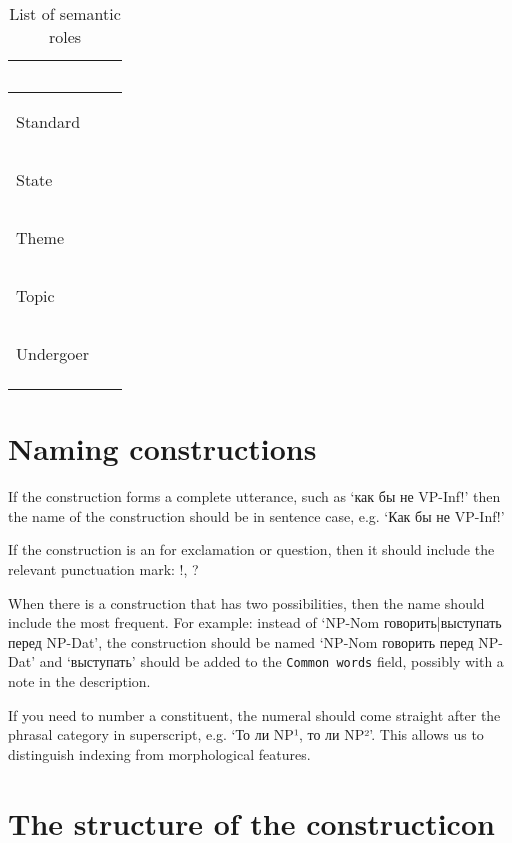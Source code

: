 \documentclass[a4paper,11pt, onecolumn,twoside]{article}
\begin{document}
\begin{longtable}{ p{}  p{} }
        & ~ \\
\midrule
 \multirow{2}{*}{Standard} & ~ \\ %
        & ~ \\
\midrule
 \multirow{2}{*}{State} & ~ \\ 
        & ~ \\
\midrule
 \multirow{2}{*}{Theme} & ~ \\ 
        & ~ \\
\midrule
 \multirow{2}{*}{Topic} & ~ \\  %
        & ~ \\
\midrule
 \multirow{2}{*}{Undergoer} & ~ \\ 
        & ~ \\
\bottomrule
\caption{List of semantic roles}
\label{table:semroles}
\end{longtable}

\section{Naming constructions}
\label{sec:name}


If the construction forms a complete utterance, such as `как бы не VP-Inf!' then the 
name of the construction should be in sentence case, e.g. `Как бы не VP-Inf!'

If the construction is an for exclamation or question, then it should include the 
relevant punctuation mark: !, ?

When there is a construction that has two possibilities, then the name should 
include the most frequent. For example: instead of `NP-Nom говорить|выступать перед NP-Dat',
the construction should be named `NP-Nom говорить перед NP-Dat' and `выступать' should
be added to the \texttt{Common words} field, possibly with a note in the description.

If you need to number a constituent, the numeral should come straight after the phrasal
category in superscript, e.g. `То ли NP¹, то ли NP²'. This allows us to distinguish indexing
from morphological features.

\section{The structure of the constructicon}
\end{document}
